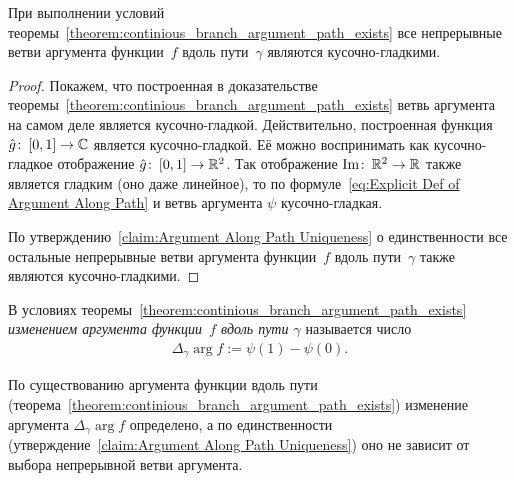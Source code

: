 \documentclass[../complex-analysis.tex]{subfiles}
\begin{document}
\begin{remrk}
 \label{remark:Piecewise Smooth Argument Along Path}
 При выполнении условий теоремы~\ref{theorem:continious_branch_argument_path_exists} все непрерывные ветви аргумента функции~$ f $ вдоль пути~$ \gamma $ являются кусочно-гладкими.
\end{remrk}
\begin{proof}
 Покажем, что построенная в доказательстве теоремы~\ref{theorem:continious_branch_argument_path_exists} ветвь аргумента на самом деле является кусочно-гладкой. Действительно, построенная функция $ \hat g \colon\,[0,1] \to \mathbb{C} $  является кусочно-гладкой. Её можно воспринимать как кусочно-гладкое отображение $ \hat g \colon\,[0,1] \to \mathbb{R}^{2} $. Так отображение $ \operatorname{Im}\colon\,\mathbb{R}^{2}\to\mathbb{R} $ также является гладким (оно даже линейное), то по формуле~\eqref{eq:Explicit Def of Argument Along Path} и ветвь аргумента $ \psi $ кусочно-гладкая.

 По утверждению~\ref{claim:Argument Along Path Uniqueness} о единственности все остальные непрерывные ветви аргумента функции~$ f $ вдоль пути~$ \gamma $ также являются кусочно-гладкими.
\end{proof}

\begin{df}
 В условиях теоремы~\ref{theorem:continious_branch_argument_path_exists} \textit{изменением аргумента функции~$ f $ вдоль пути $ \gamma $} называется число
 \begin{align*}
  \Delta_\gamma \arg f := \psi(1) - \psi(0).
 \end{align*}
\end{df}

\begin{remrk}
 По существованию аргумента функции вдоль пути (теорема~\ref{theorem:continious_branch_argument_path_exists}) изменение аргумента $ \Delta_\gamma \arg f $ определено, а по единственности (утверждение~\ref{claim:Argument Along Path Uniqueness}) оно не зависит от выбора непрерывной ветви аргумента.
\end{remrk}
\end{document}
